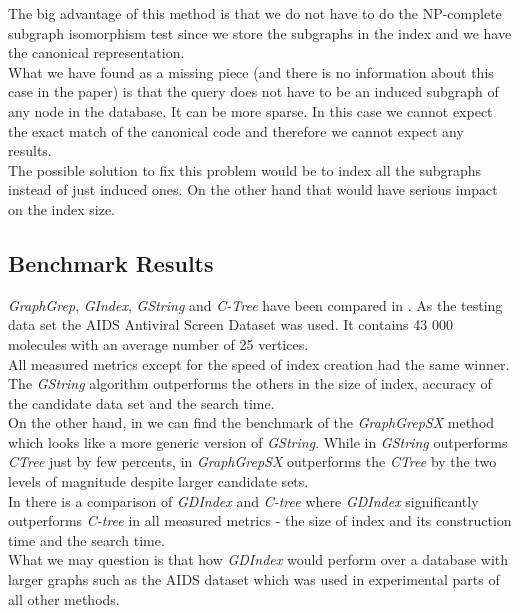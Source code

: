 The big advantage of this method is that we do not have to do the NP-complete subgraph isomorphism test since we store the subgraphs in the index and we have the canonical representation.\\

What we have found as a missing piece (and there is no information about this case in the paper) is that the query does not have to be an induced subgraph of any node in the database. It can be more sparse. In this case we cannot expect the exact match of the canonical code and therefore we cannot expect any results.\\

The possible solution to fix this problem would be to index all the subgraphs instead of just induced ones. On the other hand that would have serious impact on the index size.

\subsection{Benchmark Results}

\textit{GraphGrep}, \textit{GIndex}, \textit{GString} and \textit{C-Tree} have been compared in \cite{GString}. As the testing data set the AIDS Antiviral Screen Dataset \cite{AIDS} was used. It contains 43 000 molecules with an average number of 25 vertices.\\

All measured metrics except for the speed of index creation had the same winner. The \textit{GString} algorithm outperforms the others in the size of index, accuracy of the candidate data set and the search time.\\

On the other hand, in \cite{GraphGrepSX} we can find the benchmark of the \textit{GraphGrepSX} method which looks like a more generic version of \textit{GString}. While in \cite{GString} \textit{GString} outperforms \textit{CTree} just by few percents, in \cite{GraphGrepSX}  \textit{GraphGrepSX} outperforms the \textit{CTree} by the two levels of magnitude despite larger candidate sets.\\

In \cite{GDIndex} there is a comparison of \textit{GDIndex} and \textit{C-tree} where \textit{GDIndex} significantly outperforms \textit{C-tree} in all measured metrics - the size of index and its construction time and the search time.\\

What we may question is that how \textit{GDIndex} would perform over a database with larger graphs such as the AIDS dataset which was used in experimental parts of all other methods.\\

